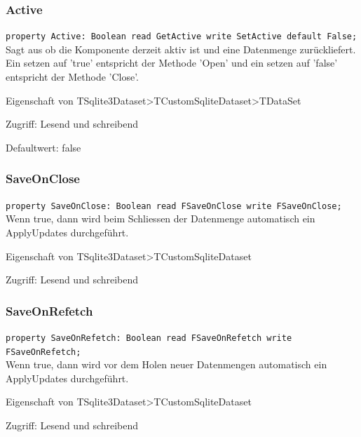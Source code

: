 \subsubsection{Active}
\begin{description}
  \item \texttt{property Active: Boolean read GetActive write SetActive default False;}\\ Sagt aus ob die Komponente derzeit aktiv ist und eine Datenmenge zurückliefert. Ein setzen auf 'true' entspricht der Methode 'Open' und ein setzen auf 'false' entspricht der Methode 'Close'.
  \begin{description}
    \item Eigenschaft von TSqlite3Dataset>TCustomSqliteDataset>TDataSet
  \end{description}
  \begin{description}
    \item Zugriff: Lesend und schreibend
    \item Defaultwert: false
  \end{description}
\end{description}

\subsubsection{SaveOnClose}
\begin{description}
  \item \texttt{property SaveOnClose: Boolean read FSaveOnClose write FSaveOnClose;}\\Wenn true, dann wird beim Schliessen der Datenmenge automatisch ein ApplyUpdates durchgeführt.
  \begin{description}
    \item Eigenschaft von TSqlite3Dataset>TCustomSqliteDataset
  \end{description}
  \begin{description}
    \item Zugriff: Lesend und schreibend
  \end{description}
\end{description}

\subsubsection{SaveOnRefetch}
\begin{description}
  \item \texttt{property SaveOnRefetch: Boolean read FSaveOnRefetch write FSaveOnRefetch;}\\Wenn true, dann wird vor dem Holen neuer Datenmengen automatisch ein ApplyUpdates durchgeführt.
  \begin{description}
    \item Eigenschaft von TSqlite3Dataset>TCustomSqliteDataset
  \end{description}
  \begin{description}
    \item Zugriff: Lesend und schreibend
  \end{description}
\end{description}

